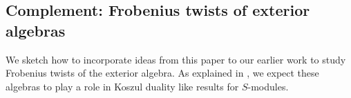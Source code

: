 \documentclass[12pt]{amsart}
\newcommand{\bN}{\mathbf{N}}
\newcommand{\fS}{\mathfrak{S}}
\newcommand{\bV}{\mathbf{V}}
\newcommand{\fm}{\mathfrak{m}}
\newcommand{\fn}{\mathfrak{n}}
\newcommand{\fp}{\mathfrak{p}}
\DeclareMathOperator{\Sym}{Sym}
\DeclareMathOperator{\Spec}{Spec}
\DeclareMathOperator{\Mod}{Mod}
\newcommand{\Sr}{S^{(r)}}
\newcommand{\GL}{\mathbf{GL}}
\numberwithin{equation}{section}
\newtheorem{theorem}[equation]{Theorem}
\newtheorem{proposition}[equation]{Proposition}
\theoremstyle{definition}
\theoremstyle{plain}
\begin{document}
\subsection{Complement: Frobenius twists of exterior algebras}
We sketch how to incorporate ideas from this paper to our earlier work \cite{gan22ext} to study Frobenius twists of the exterior algebra. As explained in \cite[Postlude]{gan24lnnr}, we expect these algebras to play a role in Koszul duality like results for $S$-modules.
\end{document}
